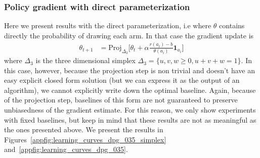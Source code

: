 \subsubsection*{Policy gradient with direct parameterization}

Here we present results with the direct parameterization, i.e where $\theta$ contains directly the probability of drawing each arm. In that case the gradient update is
\begin{align*}
    \theta_{t+1} &= \text{Proj}_{\Delta_3} \big[ \theta_t + \alpha \frac{r(a_i)-b}{\theta(a_i)} \mathbf{1}_{a_i} \big]
\end{align*}
where $\Delta_3$ is the three dimensional simplex $\Delta_3 = \{u, v, w \ge 0, u+v+w = 1\}$. In this case, however, because the projection step is non trivial and doesn't have an easy explicit closed form solution (but we can express it as the output of an algorithm), we cannot explicitly write down the optimal baseline. Again, because of the projection step, baselines of this form are not guaranteed to preserve unbiasedness of the gradient estimate. For this reason, we only show experiments with fixed baselines, but keep in mind that these results are not as meaningful as the ones presented above. We present the results in Figures~\ref{appfig:learning_curves_dpg_035_simplex} and~\ref{appfig:learning_curves_dpg_035}.

